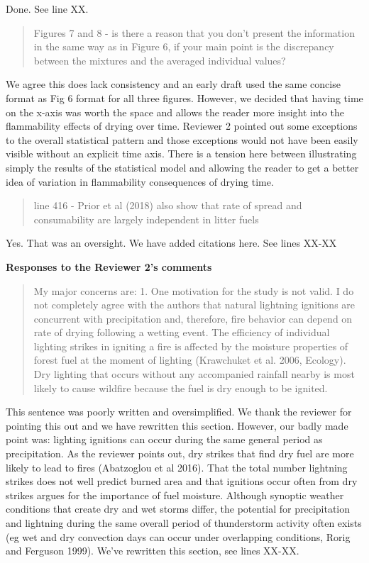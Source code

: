 \documentclass[letterpaper, 12pt]{letter}
\begin{document}
\begin{letter}{}
Done. See line XX.


\begin{quote}
Figures 7 and 8 - is there a reason that you don't present the information in the same way as in Figure 6, if your main point is the discrepancy between the mixtures and the averaged individual values?
\end{quote}

We agree this does lack consistency and an early draft used the same concise format as Fig 6 format for all three figures. However, we decided that having time on the x-axis was worth the space and allows the reader more insight into the flammability effects of drying over time. Reviewer 2 pointed out some exceptions to the overall statistical pattern and those exceptions would not have been easily visible without an explicit time axis. There is a tension here between illustrating simply the results of the statistical model and allowing the reader to get a better idea of variation in flammability consequences of drying time.

\begin{quote}
line 416 - Prior et al (2018) also show that rate of spread and consumability are largely independent in litter fuels
\end{quote}

Yes. That was an oversight. We have added citations here. See lines XX-XX


{\bf Responses to the Reviewer 2's comments}

\begin{quote}

My major concerns are:
1. One motivation for the study is not valid. I do not completely agree with the authors that natural lightning ignitions are concurrent with precipitation and, therefore, fire behavior can depend on rate of drying following a wetting event. The efficiency of individual lighting strikes in igniting a fire is affected by the moisture properties of forest fuel at the moment of lighting (Krawchuket et al. 2006, Ecology). Dry lighting that occurs without any accompanied rainfall nearby is most likely to cause wildfire because the fuel is dry enough to be ignited.
\end{quote}

This sentence was poorly written and oversimplified. We thank the reviewer
for pointing this out and we have rewritten this section. However, our badly
made point was: lighting ignitions can occur during the same general period as
precipitation. As the reviewer points out, dry strikes that find dry fuel are
more likely to lead to fires (Abatzoglou et al 2016). That the total number
lightning strikes does not well predict burned area and that ignitions occur
often from dry strikes argues for the importance of fuel moisture. Although
synoptic weather conditions that create dry and wet storms differ, the
potential for precipitation and lightning during the same overall period of
thunderstorm activity often exists (eg wet and dry convection days can occur
under overlapping conditions, Rorig and Ferguson 1999).  We've rewritten this section, see lines XX-XX. 



\end{letter}
\end{document}
